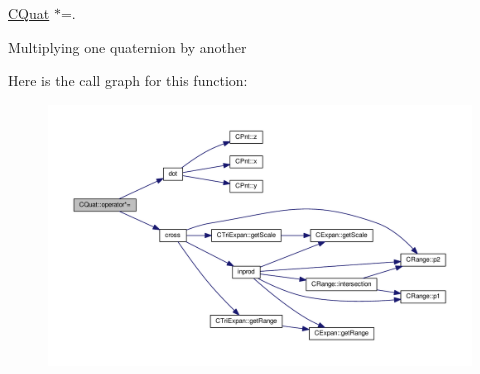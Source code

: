 \hyperlink{classCQuat}{C\-Quat} $\ast$=. 

Multiplying one quaternion by another 

Here is the call graph for this function\-:\nopagebreak
\begin{figure}[H]
\begin{center}
\leavevmode
\includegraphics[width=350pt]{classCQuat_a91a9f75dd706a025a68121522d30a561_cgraph}
\end{center}
\end{figure}


